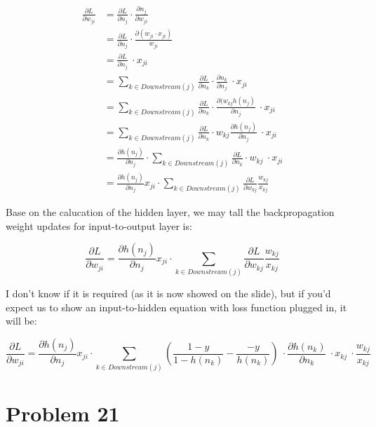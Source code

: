 \documentclass[12pt]{article}
\newcommand{\p}{\partial}
\begin{document}
\begin{align*}
    \frac{\p L}{\p w_{ji}} &= \frac{\p L}{\p n_j} \cdot \frac{\p n_j}{\p w_{ji}} \\
    &= \frac{\p L}{\p n_j} \cdot \frac{\p (w_{ji} \cdot x_{ji})}{w_{ji}} \\
    &= \frac{\p L}{\p n_j} \ \cdot x_{ji} \\
    &= \sum_{k \in Downstream(j)} \frac{\p L}{\p n_k} \cdot \frac{\p n_k}{\p n_j} \ \cdot x_{ji} \\
    &= \sum_{k \in Downstream(j)} \frac{\p L}{\p n_k} \cdot \frac{\p (w_{kj}h(n_j)}{\p n_j} \ \cdot x_{ji} \\
    &= \sum_{k \in Downstream(j)} \frac{\p L}{\p n_k} \cdot w_{kj}\frac{\p h(n_j)}{\p n_j} \ \cdot x_{ji} \\
    &= \frac{\p h(n_j)}{\p n_j} \cdot \sum_{k \in Downstream(j)} \frac{\p L}{\p n_k} \cdot w_{kj} \ \cdot x_{ji} \\
    &= \frac{\p h(n_j)}{\p n_j} x_{ji}  \cdot \sum_{k \in Downstream(j)} \frac{\p L}{\p w_{kj}} \frac{w_{kj}}{x_{kj}}
\end{align*}


Base on the calucation of the hidden layer, we may tall the backpropagation weight updates for input-to-output layer is:

\begin{equation*}
    \frac{\p L}{\p w_{ji}} = \frac{\p h(n_j)}{\p n_j} x_{ji}  \cdot \sum_{k \in Downstream(j)} \frac{\p L}{\p w_{kj}} \frac{w_{kj}}{x_{kj}}
\end{equation*}

I don't know if it is required (as it is now showed on the slide), but if you'd expect us to show an input-to-hidden equation with loss function plugged in, it will be:

\begin{equation*}
    \frac{\p L}{\p w_{ji}} = \frac{\p h(n_j)}{\p n_j} x_{ji}  \cdot \sum_{k \in Downstream(j)} (\frac{1-y}{1- h(n_k)} -\frac{-y}{h(n_k)})\ \cdot \frac{\p h(n_k)}{\p n_k} \ \cdot x_{kj} \ \cdot  \frac{w_{kj}}{x_{kj}}
\end{equation*}

\section{Problem 21}
\end{document}
